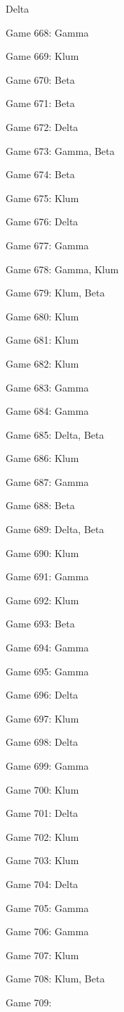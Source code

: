 \documentclass{article}
\begin{document}
\begin{multicols}{3}
\begin{compactitem}
Delta
\item Game 668:
Gamma
\item Game 669:
Klum
\item Game 670:
Beta
\item Game 671:
Beta
\item Game 672:
Delta
\item Game 673:
Gamma, Beta
\item Game 674:
Beta
\item Game 675:
Klum
\item Game 676:
Delta
\item Game 677:
Gamma
\item Game 678:
Gamma, Klum
\item Game 679:
Klum, Beta
\item Game 680:
Klum
\item Game 681:
Klum
\item Game 682:
Klum
\item Game 683:
Gamma
\item Game 684:
Gamma
\item Game 685:
Delta, Beta
\item Game 686:
Klum
\item Game 687:
Gamma
\item Game 688:
Beta
\item Game 689:
Delta, Beta
\item Game 690:
Klum
\item Game 691:
Gamma
\item Game 692:
Klum
\item Game 693:
Beta
\item Game 694:
Gamma
\item Game 695:
Gamma
\item Game 696:
Delta
\item Game 697:
Klum
\item Game 698:
Delta
\item Game 699:
Gamma
\item Game 700:
Klum
\item Game 701:
Delta
\item Game 702:
Klum
\item Game 703:
Klum
\item Game 704:
Delta
\item Game 705:
Gamma
\item Game 706:
Gamma
\item Game 707:
Klum
\item Game 708:
Klum, Beta
\item Game 709:

\end{compactitem}
\end{multicols}
\end{document}
